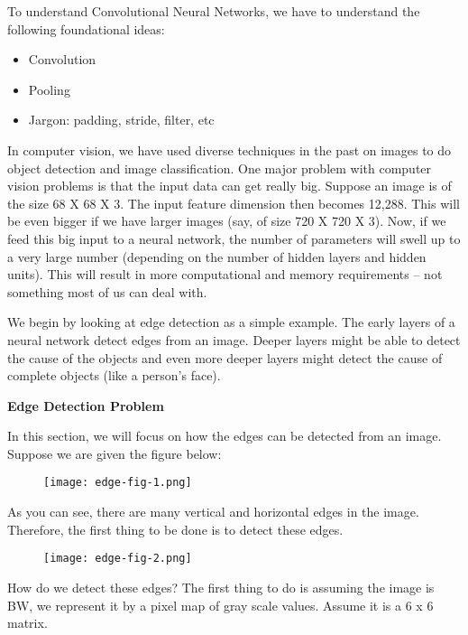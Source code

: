 \doublespacing
\setlength{\parindent}{1cm}

To understand Convolutional Neural Networks, we have to understand the following foundational ideas:

\begin{itemize}
  \item Convolution
  \item Pooling
  \item Jargon: padding, stride, filter, etc
\end{itemize}

In computer vision, we have used diverse techniques in the past on images to do object detection and image classification. One major problem with computer vision problems is that the input data can get really big. Suppose an image is of the size 68 X 68 X 3. The input feature dimension then becomes 12,288. This will be even bigger if we have larger images (say, of size 720 X 720 X 3). Now, if we feed this big input to a neural network, the number of parameters will swell up to a very large number (depending on the number of hidden layers and hidden units). This will result in more computational and memory requirements – not something most of us can deal with. \par

We begin by looking at edge detection as a simple example. The early layers of a neural network detect edges from an image. Deeper layers might be able to detect the cause of the objects and even more deeper layers might detect the cause of complete objects (like a person’s face). \par

\textbf{Edge Detection Problem}

In this section, we will focus on how the edges can be detected from an image. Suppose we are given the figure below:

\begin{figure}
  \texttt{[image: edge-fig-1.png]}
\end{figure}

As you can see, there are many vertical and horizontal edges in the image. Therefore, the first thing to be done is to detect these edges.

\begin{figure}
  \texttt{[image: edge-fig-2.png]}
\end{figure}

How do we detect these edges? The first thing to do is assuming the image is BW, we represent it by a pixel map of gray scale values. Assume it is a 6 x 6 matrix.

